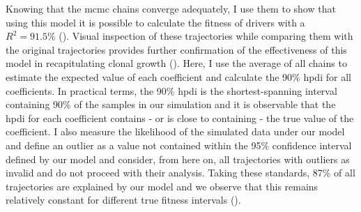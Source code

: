 \begin{figure}[h]
	\label{fig:mcmc-chains-sim}
\end{figure}

\begin{figure}[h]
	\label{fig:mcmc-ess}
\end{figure}

Knowing that the \ac{mcmc} chains converge adequately, I use them to show that using this model it is possible to calculate the fitness of drivers with a $R^2 = 91.5\%$ (). Visual inspection of these trajectories while comparing them with the original trajectories provides further confirmation of the effectiveness of this model in recapitulating clonal growth (). Here, I use the average of all chains to estimate the expected value of each coefficient and calculate the 90\% \ac{hpdi} for all coefficients. In practical terms, the 90\% \ac{hpdi} is the shortest-spanning interval containing 90\% of the samples in our simulation and it is observable that the \ac{hpdi} for each coefficient contains - or is close to containing - the true value of the coefficient. I also measure the likelihood of the simulated data under our model and define an outlier as a value not contained within the 95\% confidence interval defined by our model and consider, from here on, all trajectories with outliers as invalid and do not proceed with their analysis. Taking these standards, 87\% of all trajectories are explained by our model and we observe that this remains relatively constant for different true fitness intervals ().

\begin{figure}[h]
	\label{fig:sim-vs-inf-driver}
\end{figure}

\begin{figure}[h]
	\label{fig:trajectory-examples-sim}
\end{figure}

